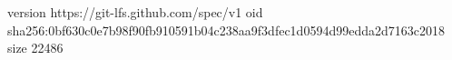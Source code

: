 version https://git-lfs.github.com/spec/v1
oid sha256:0bf630c0e7b98f90fb910591b04c238aa9f3dfec1d0594d99edda2d7163c2018
size 22486
